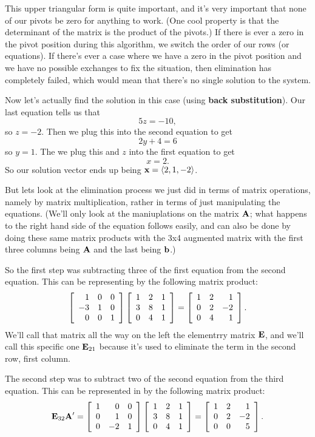 This upper triangular form is quite important, and it's very important that none of our pivots be zero for anything to work. (One cool property is that the determinant of the matrix is the product of the pivots.) If there is ever a zero in the pivot position during this algorithm, we switch the order of our rows (or equations). If there's ever a case where we have a zero in the pivot position and we have no possible exchanges to fix the situation, then elimination has completely failed, which would mean that there's no single solution to the system. 

Now let's actually find the solution in this case (using \textbf{back substitution}). Our last equation tells us that
\[ 5z = -10, \]
so $z = -2$. Then we plug this into the second equation to get
\[ 2y + 4 = 6\]
so $y = 1$. The we plug this and $z$ into the first equation to get
\[ x = 2.\]
So our solution vector ends up being $\boldsymbol{\mathbf{x}} = \langle 2,1,-2 \rangle$.

But lets look at the elimination process we just did in terms of matrix operations, namely by matrix multiplication, rather in terms of just manipulating the equations. (We'll only look at the maniuplations on the matrix $\boldsymbol{\mathbf{A}}$; what happens to the right hand side of the equation follows easily, and can also be done by doing these same matrix products with the 3x4 augmented matrix with the first three columns being $\boldsymbol{\mathbf{A}}$ and the last being $\boldsymbol{\mathbf{b}}$.)

So the first step was subtracting three of the first equation from the second equation. This can be representing by the following matrix product:
\[ \left[ \begin{array}{rrrrrrrrrrrrrrrrrrrrrrrrr} 1&0&0\\-3&1&0\\0&0&1\\ \end{array} \right]\left[ \begin{array}{rrrrrrrrrrrrrrrrrrrrrrrrr} 1&2&1\\3&8&1\\0&4&1\\ \end{array} \right] = \left[ \begin{array}{rrrrrrrrrrrrrrrrrrrrrrrrr} 1&2&1\\0&2&-2\\0&4&1\\ \end{array} \right]. \]
We'll call that matrix all the way on the left the elementrry matrix $\boldsymbol{\mathbf{E}}$, and we'll call this specific one $\boldsymbol{\mathbf{E}}_{21}$ because it's used to eliminate the term in the second row, first column. 

The second step was to subtract two of the second equation from the third equation. This can be represented in by the following matrix product:
\[ \boldsymbol{\mathbf{E}}_{32}\boldsymbol{\mathbf{A}}' = \left[ \begin{array}{rrrrrrrrrrrrrrrrrrrrrrrrr} 1&0&0\\0&1&0\\0&-2&1\\ \end{array} \right]\left[ \begin{array}{rrrrrrrrrrrrrrrrrrrrrrrrr} 1&2&1\\3&8&1\\0&4&1\\ \end{array} \right] = \left[ \begin{array}{rrrrrrrrrrrrrrrrrrrrrrrrr} 1&2&1\\0&2&-2\\0&0&5\\ \end{array} \right]. \]

